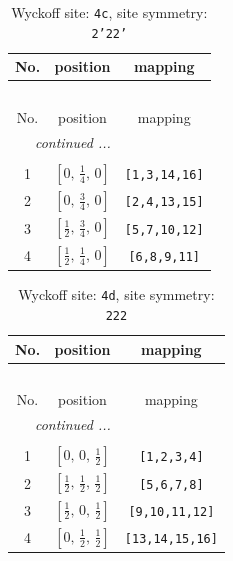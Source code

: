 \documentclass[fleqn,8pt]{jsarticle}
\begin{document}
\renewcommand{\arraystretch}{1.2}
\begin{longtable}{ccc}
\caption{Wyckoff site: {\tt 4c}, site symmetry: {\tt 2'22'}}
 \\
 \hline \hline
No. & position & mapping \\ \hline \endfirsthead

\multicolumn{2}{l}{\tablename\ \thetable{}} \\
 \hline \hline
No. & position & mapping \\ \hline \endhead

 \hline \hline
\multicolumn{2}{r}{\footnotesize\it continued ...} \\ \endfoot

 \hline \hline
\multicolumn{2}{r}{} \\ \endlastfoot

1 & $\left[ 0,\, \frac{1}{4},\, 0 \right]$ & {\tt [1,3,14,16]} \\ \hline
2 & $\left[ 0,\, \frac{3}{4},\, 0 \right]$ & {\tt [2,4,13,15]} \\ \hline
3 & $\left[ \frac{1}{2},\, \frac{3}{4},\, 0 \right]$ & {\tt [5,7,10,12]} \\ \hline
4 & $\left[ \frac{1}{2},\, \frac{1}{4},\, 0 \right]$ & {\tt [6,8,9,11]} \\
\end{longtable}
\renewcommand{\arraystretch}{1.2}
\begin{longtable}{ccc}
\caption{Wyckoff site: {\tt 4d}, site symmetry: {\tt 222}}
 \\
 \hline \hline
No. & position & mapping \\ \hline \endfirsthead

\multicolumn{2}{l}{\tablename\ \thetable{}} \\
 \hline \hline
No. & position & mapping \\ \hline \endhead

 \hline \hline
\multicolumn{2}{r}{\footnotesize\it continued ...} \\ \endfoot

 \hline \hline
\multicolumn{2}{r}{} \\ \endlastfoot

1 & $\left[ 0,\, 0,\, \frac{1}{2} \right]$ & {\tt [1,2,3,4]} \\ \hline
2 & $\left[ \frac{1}{2},\, \frac{1}{2},\, \frac{1}{2} \right]$ & {\tt [5,6,7,8]} \\ \hline
3 & $\left[ \frac{1}{2},\, 0,\, \frac{1}{2} \right]$ & {\tt [9,10,11,12]} \\ \hline
4 & $\left[ 0,\, \frac{1}{2},\, \frac{1}{2} \right]$ & {\tt [13,14,15,16]} \\
\end{longtable}
\end{document}

